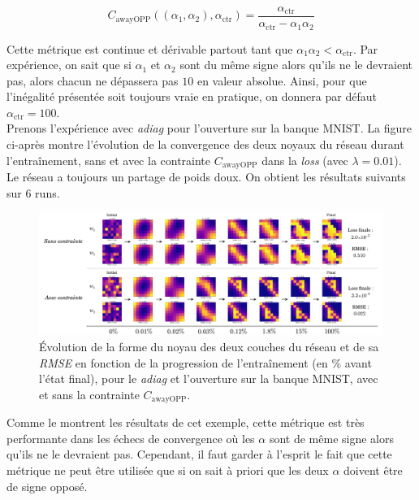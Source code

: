 \vspace{-5.0mm}
\begin{equation}
    C_\text{awayOPP}((\alpha_1, \alpha_2), \alpha_\text{ctr}) = 
    \frac{\alpha_\text{ctr}}{\alpha_\text{ctr} - \alpha_1 \alpha_2}
    \label{erreur_awayOPP}
\end{equation}



\vspace{4.5mm}
\noindent Cette métrique est continue et dérivable partout tant que $\alpha_1 \alpha_2 < \alpha_\text{ctr}$. Par expérience, on sait que si $\alpha_1$ et $\alpha_2$ sont du même signe alors qu'ils ne le devraient pas, alors chacun ne dépassera pas $10$ en valeur absolue. Ainsi, pour que l'inégalité présentée soit toujours vraie en pratique, on donnera par défaut $\alpha_\text{ctr} = 100$. \\

\vspace{-1.6mm}
Prenons l'expérience avec \textit{adiag} pour l'ouverture sur la banque MNIST. La figure ci-après montre l'évolution de la convergence des deux noyaux du réseau durant l'entraînement, sans et avec la contrainte $C_\text{awayOPP}$ dans la \textit{loss} (avec $\lambda = 0.01$). Le réseau a toujours un partage de poids doux. On obtient les résultats suivants sur 6 runs. \\


\vspace{-1.0mm}
\begin{figure}[htp]
  \begin{center}
    \includegraphics[width=1.00\linewidth]{parts/3-contributions/C-contraintes_geometriques/figures/k_awayOPP.pdf}
    \vspace{-4.0mm}
    \caption{ \centering Évolution de la forme du noyau des deux couches du réseau et de sa \textit{RMSE} en fonction de la progression de l'entraînement (en \% avant l'état final), pour le \textit{adiag} et l'ouverture sur la banque MNIST, avec et sans la contrainte $C_\text{awayOPP}$.}
    \label{fig:c_awayOPP}
  \end{center}
\end{figure}

\vspace{-3.6mm}
\noindent Comme le montrent les résultats de cet exemple, cette métrique est très performante dans les échecs de convergence où les $\alpha$ sont de même signe alors qu'ils ne le devraient pas. Cependant, il faut garder à l'esprit le fait que cette métrique ne peut être utilisée que si on sait à priori que les deux $\alpha$ doivent être de signe opposé.
